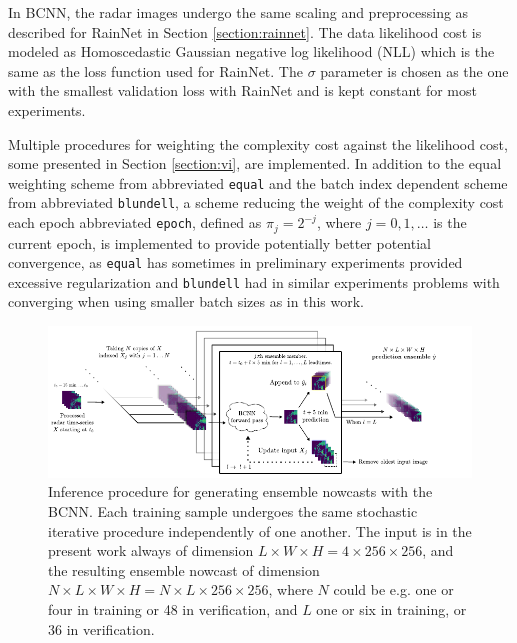 In BCNN, the radar images undergo the same scaling and preprocessing as described for RainNet in Section \ref{section:rainnet}. The data likelihood cost is modeled as Homoscedastic Gaussian negative log likelihood (NLL) which is the same as the loss function used for RainNet. The $\sigma$ parameter is chosen as the one with the smallest validation loss with RainNet and is kept constant for most experiments. 

Multiple procedures for weighting the complexity cost against the likelihood cost, some presented in Section \ref{section:vi}, are implemented. In addition to the equal weighting scheme from \citet{graves_practical_2011} abbreviated \texttt{equal} and the batch index dependent scheme from \citet{blundell_weight_2015} abbreviated \texttt{blundell}, a scheme reducing the weight of the complexity cost each epoch abbreviated \texttt{epoch}, defined as $\pi_j = 2^{-j}$, where $j=0,1,\dots$ is the current epoch, is implemented to provide potentially better potential convergence, as \texttt{equal} has sometimes in preliminary experiments provided excessive regularization and \texttt{blundell} had in similar experiments problems with converging when using smaller batch sizes as in this work.



\begin{figure}[h]
	\begin{center}
		\includegraphics[scale=1]{images/inference_diagram/inference_diagram.pdf}
		\caption{Inference procedure for generating ensemble nowcasts with the BCNN. Each training sample undergoes the same stochastic iterative procedure independently of one another. The input is in the present work always of dimension $L \times W \times H = 4 \times 256 \times 256$, and the resulting ensemble nowcast of dimension $N \times L \times W \times H = N \times L \times 256 \times 256$, where $N$ could be e.g. one or four in training or 48 in verification, and $L$ one or six in training, or 36 in verification.}
		\label{fig:inference}
	\end{center}
\end{figure}

